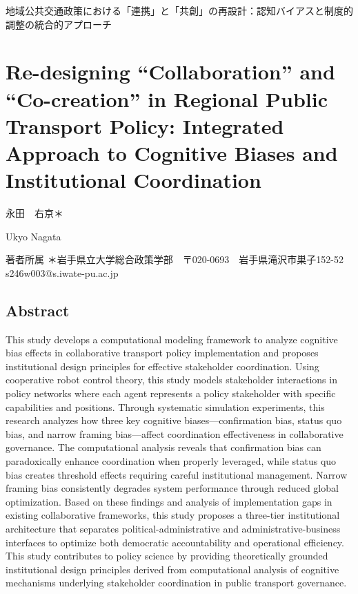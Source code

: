 地域公共交通政策における「連携」と「共創」の再設計：認知バイアスと制度的調整の統合的アプローチ

\section{Re-designing ``Collaboration'' and ``Co-creation'' in Regional Public Transport Policy: Integrated Approach to Cognitive Biases and Institutional Coordination}\label{re-designing-collaboration-and-co-creation-in-regional-public-transport-policy-integrated-approach-to-cognitive-biases-and-institutional-coordination}

永田　右京＊

Ukyo Nagata

著者所属 ＊岩手県立大学総合政策学部　〒020-0693　岩手県滝沢市巣子152-52　s246w003@s.iwate-pu.ac.jp

\subsection{Abstract}\label{abstract}

This study develops a computational modeling framework to analyze cognitive bias effects in collaborative transport policy implementation and proposes institutional design principles for effective stakeholder coordination. Using cooperative robot control theory, this study models stakeholder interactions in policy networks where each agent represents a policy stakeholder with specific capabilities and positions. Through systematic simulation experiments, this research analyzes how three key cognitive biases---confirmation bias, status quo bias, and narrow framing bias---affect coordination effectiveness in collaborative governance. The computational analysis reveals that confirmation bias can paradoxically enhance coordination when properly leveraged, while status quo bias creates threshold effects requiring careful institutional management. Narrow framing bias consistently degrades system performance through reduced global optimization. Based on these findings and analysis of implementation gaps in existing collaborative frameworks, this study proposes a three-tier institutional architecture that separates political-administrative and administrative-business interfaces to optimize both democratic accountability and operational efficiency. This study contributes to policy science by providing theoretically grounded institutional design principles derived from computational analysis of cognitive mechanisms underlying stakeholder coordination in public transport governance.


